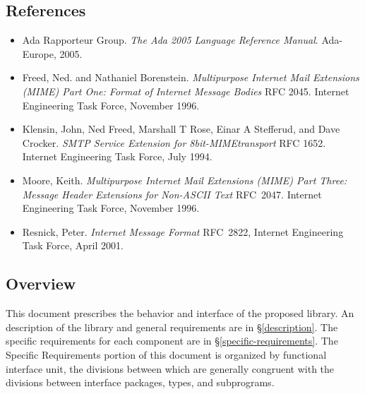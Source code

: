 \documentclass[11pt]{article}
\begin{document}
\subsection{References}

\begin{itemize}

\item Ada Rapporteur Group. \emph{The Ada 2005 Language Reference
  Manual}. Ada-Europe, 2005.

\item Freed, Ned. and Nathaniel Borenstein. \emph{Multipurpose Internet Mail
  Extensions (MIME) Part One: Format of Internet Message Bodies} RFC
2045.  Internet Engineering Task Force, November 1996.

\item Klensin, John, Ned Freed, Marshall T Rose, Einar A Stefferud, and Dave
Crocker. \emph{SMTP Service Extension for 8bit-MIMEtransport} RFC
1652. Internet Engineering Task Force, July 1994.

\item Moore, Keith. \emph{Multipurpose Internet Mail Extensions (MIME) Part
  Three: Message Header Extensions for Non-ASCII Text} RFC~2047.
Internet Engineering Task Force, November 1996.

\item Resnick, Peter. \emph{Internet Message Format} RFC~2822, Internet
Engineering Task Force, April 2001.

\end{itemize}



\subsection{Overview}

This document prescribes the behavior and interface of the proposed
library. An description of the library and general requirements are in
\S\ref{description}. The specific requirements for each component are
in \S\ref{specific-requirements}. The Specific Requirements portion of
this document is organized by functional interface unit, the divisions
between which are generally congruent with the divisions between
interface packages, types, and subprograms.
\end{document}
